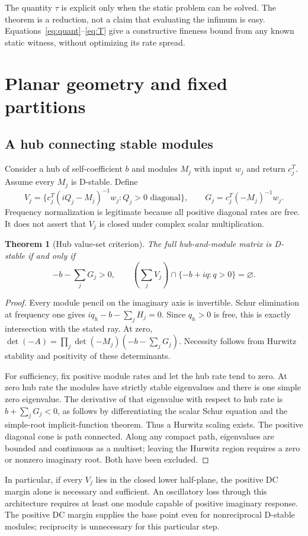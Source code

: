 \documentclass[11pt]{article}
\newtheorem{theorem}{Theorem}[section]
\theoremstyle{remark}\newtheorem{remark}[theorem]{Remark}
\begin{document}
The quantity $\tau$ is explicit only when the static problem can be solved.
The theorem is a reduction, not a claim that evaluating the infimum is easy.
Equations~\eqref{eq:quant}--\eqref{eq:T} give a constructive fineness bound
from any known static witness, without optimizing its rate spread.

\section{Planar geometry and fixed partitions}
\subsection{A hub connecting stable modules}
Consider a hub of self-coefficient $b$ and modules $M_j$ with input $w_j$
and return $c_j^T$. Assume every $M_j$ is D-stable. Define
\[
 V_j=\{c_j^T(iQ_j-M_j)^{-1}w_j:Q_j>0\text{ diagonal}\},
 \qquad G_j=c_j^T(-M_j)^{-1}w_j.
\]
Frequency normalization is legitimate because all positive diagonal rates
are free. It does not assert that $V_j$ is closed under complex scalar
multiplication.

\begin{theorem}[Hub value-set criterion]\label{thm:hub}
The full hub-and-module matrix is D-stable if and only if
\[
 -b-\sum_jG_j>0,\qquad
 \left(\sum_jV_j\right)\cap\{-b+iq:q>0\}=\varnothing.
\]
\end{theorem}
\begin{proof}
Every module pencil on the imaginary axis is invertible. Schur elimination
at frequency one gives $iq_h-b-\sum_jH_j=0$. Since $q_h>0$ is free,
this is exactly intersection with the stated ray. At zero,
$\det(-A)=\prod_j\det(-M_j)(-b-\sum_jG_j)$.
Necessity follows from Hurwitz stability and positivity of these determinants.

For sufficiency, fix positive module rates and let the hub rate tend to
zero. At zero hub rate the modules have strictly stable eigenvalues and
there is one simple zero eigenvalue. The derivative of that eigenvalue
with respect to hub rate is $b+\sum_jG_j<0$, as follows by differentiating
the scalar Schur equation and the simple-root implicit-function theorem.
Thus a Hurwitz scaling exists. The positive
diagonal cone is path connected. Along any compact path, eigenvalues are
bounded and continuous as a multiset; leaving the Hurwitz region requires
a zero or nonzero imaginary root. Both have been excluded.
\end{proof}

In particular, if every $V_j$ lies in the closed lower half-plane, the
positive DC margin alone is necessary and sufficient. An oscillatory
loss through this architecture requires at least one module capable of
positive imaginary response. The positive DC margin supplies the base
point even for nonreciprocal D-stable modules; reciprocity is unnecessary
for this particular step.
\end{document}
